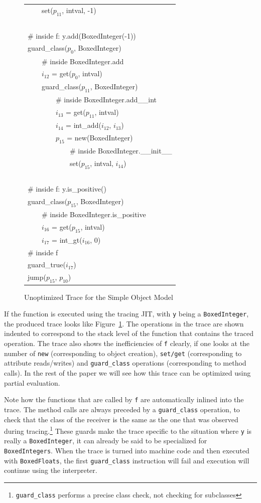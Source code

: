 \documentclass{sigplanconf}
\begin{document}
\begin{figure}
{\begin{tabular}{l}
~~~~set($p_{11}$, intval, -1) \\
~\\
\# inside f: y.add(BoxedInteger(-1)) \\
guard\_class($p_{0}$, BoxedInteger) \\
~~~~\# inside BoxedInteger.add \\
~~~~$i_{12}$ = get($p_{0}$, intval) \\
~~~~guard\_class($p_{11}$, BoxedInteger) \\
~~~~~~~~\# inside BoxedInteger.add\_\_int \\
~~~~~~~~$i_{13}$ = get($p_{11}$, intval) \\
~~~~~~~~$i_{14}$ = int\_add($i_{12}$, $i_{13}$) \\
~~~~~~~~$p_{15}$ = new(BoxedInteger) \\
~~~~~~~~~~~~\# inside BoxedInteger.\_\_init\_\_ \\
~~~~~~~~~~~~set($p_{15}$, intval, $i_{14}$) \\
~\\
\# inside f: y.is\_positive() \\
guard\_class($p_{15}$, BoxedInteger) \\
~~~~\# inside BoxedInteger.is\_positive \\
~~~~$i_{16}$ = get($p_{15}$, intval) \\
~~~~$i_{17}$ = int\_gt($i_{16}$, 0) \\
\# inside f \\
guard\_true($i_{17}$) \\
jump($p_{15}$, $p_{10}$) \\
\end{tabular}
}
\caption{Unoptimized Trace for the Simple Object Model}
\label{fig:unopt-trace}
\end{figure}

If the function is executed using the tracing JIT, with \texttt{y} being a
\texttt{BoxedInteger}, the produced trace looks like
Figure~\ref{fig:unopt-trace}. The operations in the trace are shown indented to
correspond to the stack level of the function that contains the traced
operation. The trace also shows the inefficiencies of \texttt{f} clearly, if one
looks at the number of \texttt{new} (corresponding to object creation),
\texttt{set/get} (corresponding to attribute reads/writes) and
\texttt{guard\_class} operations (corresponding to method calls).
In the rest of the paper we will see how this trace can be optimized using
partial evaluation.

Note how the functions that are called by \texttt{f} are automatically inlined
into the trace. The method calls are always preceded by a \texttt{guard\_class}
operation, to check that the class of the receiver is the same as the one that
was observed during tracing.\footnote{\texttt{guard\_class} performs a precise
class check, not checking for subclasses} These guards make the trace specific
to the situation where \texttt{y} is really a \texttt{BoxedInteger}, it can
already be said to be specialized for \texttt{BoxedIntegers}. When the trace is
turned into machine code and then executed with \texttt{BoxedFloats}, the
first \texttt{guard\_class} instruction will fail and execution will continue
using the interpreter.
\end{document}
